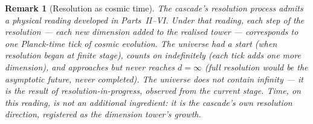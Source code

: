 \documentclass[11pt,a4paper]{article}
\newtheorem{remark}[theorem]{Remark}
\begin{document}
\begin{remark}[Resolution as cosmic time]
The cascade's resolution process admits a physical reading developed
in Parts~II--VI. Under that reading, each step of the resolution ---
each new dimension added to the realised tower --- corresponds to
one Planck-time tick of cosmic evolution. The universe had a start
(when resolution began at finite stage), counts on indefinitely
(each tick adds one more dimension), and approaches but never reaches
$d=\infty$ (full resolution would be the asymptotic future, never
completed). The universe does not \emph{contain} infinity --- it is
the result of resolution-in-progress, observed from the current
stage. Time, on this reading, is not an additional ingredient: it
is the cascade's own resolution direction, registered as the
dimension tower's growth.


\end{remark}
\end{document}
